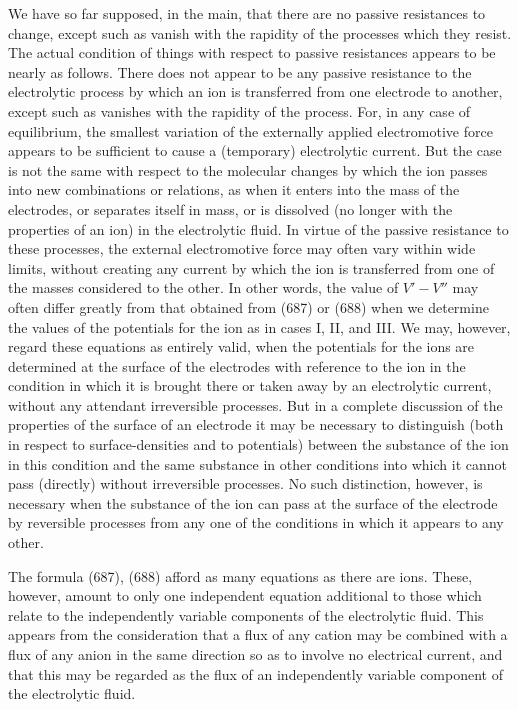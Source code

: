 \documentclass[12pt]{article}
\begin{document}
We have so far supposed, in the main, that there are no passive resistances to change, except such as vanish with the rapidity of the processes which they resist. The actual condition of things with respect to passive resistances appears to be nearly as follows. There does not appear to be any passive resistance to the electrolytic process by which an ion is transferred from one electrode to another, except such as vanishes with the rapidity of the process. For, in any case of equilibrium, the smallest variation of the externally applied electromotive force appears to be sufficient to cause a (temporary) electrolytic current. But the case is not the same with respect to the molecular changes by which the ion passes into new combinations or relations, as when it enters into the mass of the electrodes, or separates itself in mass, or is dissolved (no longer with the properties of an ion) in the electrolytic fluid. In virtue of the passive resistance to these processes, the external electromotive force may often vary within wide limits, without creating any current by which the ion is transferred from one of the masses considered to the other. In other words, the value of $V'- V''$ may often differ greatly from that obtained from (687) or (688) when we determine the values of the potentials for the ion as in cases I, II, and III. We may, however, regard these equations as entirely valid, when the potentials for the ions are determined at the surface of the electrodes with reference to the ion in the condition in which it is brought there or taken away by an electrolytic current, without any attendant irreversible processes. But in a complete discussion of the properties of the surface of an electrode it may be necessary to distinguish (both in respect to surface-densities and to potentials) between the substance of the ion in this condition and the same substance in other conditions into which it cannot pass (directly) without irreversible processes. No such distinction, however, is necessary when the substance of the ion can pass at the surface of the electrode by reversible processes from any one of the conditions in which it appears to any other.

The formula (687), (688) afford as many equations as there are ions. These, however, amount to only one independent equation additional to those which relate to the independently variable components of the electrolytic fluid. This appears from the consideration that a flux of any cation may be combined with a flux of any anion in the same direction so as to involve no electrical current, and that this may be regarded as the flux of an independently variable component of the electrolytic fluid.
\end{document}
